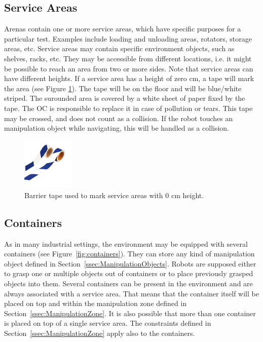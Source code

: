 \subsection{Service Areas} \label{ssec:serviceareas} Arenas contain one or more
service areas, which have specific purposes for a particular test. Examples
include loading and unloading areas, rotators, storage areas,
etc. Service areas may contain specific environment objects, such as shelves,
racks, etc. They may be accessible from different locations, i.e. it might be
possible to reach an area from two or more sides. Note that service areas can
have different heights. If a service area has a height of zero cm, a tape will
mark the area (see Figure \ref{fig:barrier_tape_0cm}). The tape will be on the
floor and will be blue/white striped. The surounded area is
covered by a white sheet of paper fixed by the tape. The OC is responsible
to replace it in case of pollution or tears. This tape may be crossed, and does not
count as a collision. If the robot touches an manipulation object while
navigating, this will be handled as a collision. 

\begin{figure} [h!]
\begin{center}
\includegraphics[height = 2.5cm]{./images/barrier_tape_0cm_area.jpg}
\end{center}
\caption{Barrier tape used to mark service areas with 0 cm height.}
\label{fig:barrier_tape_0cm}
\end{figure}


\subsection{Containers}
As in many industrial settings, the \RCAW environment may be equipped with several containers (see Figure~\ref{fig:containers}). They can store any kind of manipulation object defined in Section~\ref{ssec:ManipulationObjects}. Robots are supposed either to grasp one or multiple objects out of containers or to place previously grasped objects into them. Several containers can be present in the environment and are always associated with a service area. That means that the container itself will be placed on top and within the manipulation zone defined in Section~\ref{ssec:ManipulationZone}.
It is also possible that more than one container is placed on top of a single service area.
The constraints defined in Section~\ref{ssec:ManipulationZone} apply also to the containers.

